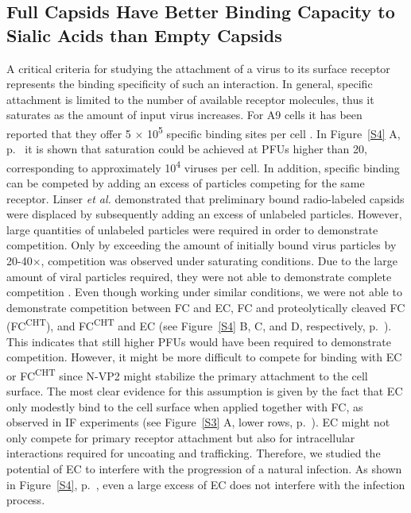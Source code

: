 \subsection{Full Capsids Have Better Binding Capacity to Sialic Acids than Empty Capsids}

A critical criteria for studying the attachment of a virus to its surface receptor represents the binding specificity of such an interaction. In general, specific attachment is limited to the number of available receptor molecules, thus it saturates as the amount of input virus increases. For A9 cells it has been reported that they offer 5 $\times$ 10\textsuperscript{5} specific binding sites per cell \cite{pmid20517}. In Figure~\ref{S4} A, p.~\pageref{S4} it is shown that saturation could be achieved at PFUs higher than 20, corresponding to approximately 10\textsuperscript{4} viruses per cell. In addition, specific binding can be competed by adding an excess of particles competing for the same receptor. Linser \textit{et al.} demonstrated that preliminary bound radio-labeled capsids were displaced by subsequently adding an excess of unlabeled particles. However, large quantities of unlabeled particles were required in order to demonstrate competition. Only by exceeding the amount of initially bound virus particles by 20-40$\times$, competition was observed under saturating conditions. Due to the large amount of viral particles required, they were not able to demonstrate complete competition \cite{pmid20517}. Even though working under similar conditions, we were not able to demonstrate competition between FC and EC, FC and proteolytically cleaved FC (FC\textsuperscript{CHT}), and FC\textsuperscript{CHT} and EC (see Figure~\ref{S4} B, C, and D, respectively, p.~\pageref{S4}). This indicates that still higher PFUs would have been required to demonstrate competition. However, it might be more difficult to compete for binding with EC or FC\textsuperscript{CHT} since N-VP2 might stabilize the primary attachment to the cell surface. The most clear evidence for this assumption is given by the fact that EC only modestly bind to the cell surface when applied together with FC, as observed in IF experiments (see Figure~\ref{S3} A, lower rows, p.~\pageref{S3}). EC might not only compete for primary receptor attachment but also for intracellular interactions required for uncoating and trafficking. Therefore, we studied the potential of EC to interfere with the progression of a natural infection. As shown in Figure~\ref{S4}, p.~\pageref{S4}, even a large excess of EC does not interfere with the infection process. 

